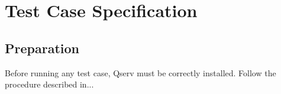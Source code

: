 \section{Test Case Specification}

\subsection{Preparation}

Before running any test case, Qserv must be correctly
installed. Follow the procedure described in...


